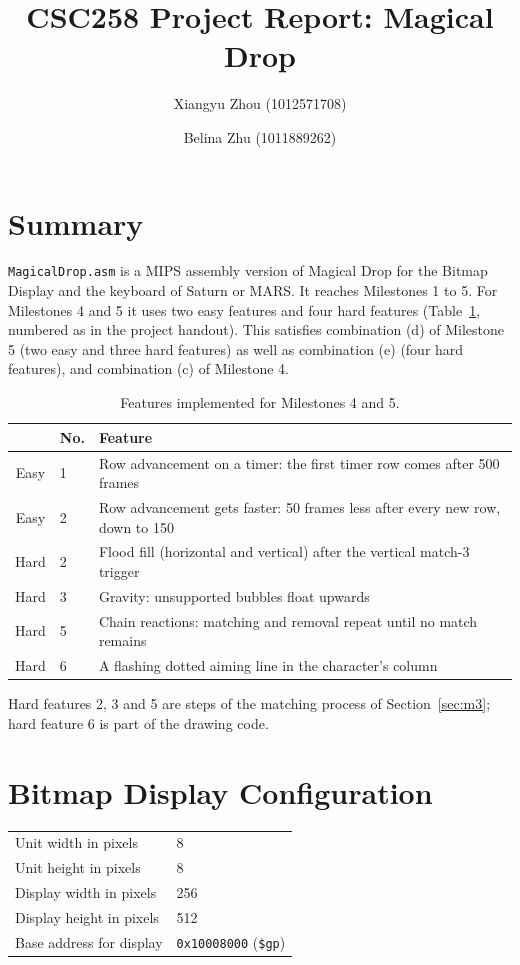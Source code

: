 \documentclass[11pt]{article}
\title{CSC258 Project Report: Magical Drop}
\author{Xiangyu Zhou (1012571708) \and Belina Zhu (1011889262)}
\date{}
\newcommand{\code}[1]{\texttt{#1}}
\begin{document}
\maketitle

\section{Summary}

\code{MagicalDrop.asm} is a MIPS assembly version of Magical Drop for the
Bitmap Display and the keyboard of Saturn or MARS. It reaches Milestones 1 to
5. For Milestones 4 and 5 it uses two easy features and four hard features
(Table~\ref{tab:features}, numbered as in the project handout). This
satisfies combination (d) of Milestone 5 (two easy and three hard features)
as well as combination (e) (four hard features), and combination (c) of
Milestone 4.

\begin{table}[H]
\centering
\begin{tabular}{@{}clp{9.5cm}@{}}
\toprule
 & No. & Feature\\
\midrule
Easy & 1 & Row advancement on a timer: the first timer row comes after 500 frames\\
Easy & 2 & Row advancement gets faster: 50 frames less after every new row, down to 150\\
\midrule
Hard & 2 & Flood fill (horizontal and vertical) after the vertical match-3 trigger\\
Hard & 3 & Gravity: unsupported bubbles float upwards\\
Hard & 5 & Chain reactions: matching and removal repeat until no match remains\\
Hard & 6 & A flashing dotted aiming line in the character's column\\
\bottomrule
\end{tabular}
\caption{Features implemented for Milestones 4 and 5.}
\label{tab:features}
\end{table}

Hard features 2, 3 and 5 are steps of the matching process of
Section~\ref{sec:m3}; hard feature 6 is part of the drawing code.

\section{Bitmap Display Configuration}

\begin{center}
\begin{tabular}{@{}ll@{}}
\toprule
Unit width in pixels & 8\\
Unit height in pixels & 8\\
Display width in pixels & 256\\
Display height in pixels & 512\\
Base address for display & \code{0x10008000} (\code{\$gp})\\
\bottomrule
\end{tabular}
\end{center}
\end{document}
